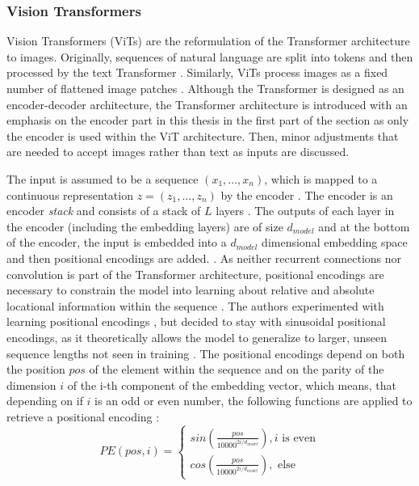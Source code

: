 \subsubsection{Vision Transformers}
\label{section: Vision Transformers}
Vision Transformers (ViTs) are the reformulation of the Transformer architecture \cite{Vaswani2017} to images.
Originally, sequences of natural language are split into tokens and then processed by the text Transformer \citep{Vaswani2017}.  
Similarly, ViTs process images as a fixed number of flattened image patches \citep{Dosovitskiy2020}.
Although the Transformer is designed as an encoder-decoder architecture, the Transformer architecture is introduced with an emphasis on the encoder part in this thesis in the first part of the section as only the encoder is used within the ViT architecture.
Then, minor adjustments that are needed to accept images rather than text as inputs are discussed.
\par
The input is assumed to be a sequence $(x_1,\dots,x_n)$, which is mapped to a continuous representation $z=(z_1,\dots,z_n)$ by the encoder \citep{Vaswani2017}.
The encoder is an encoder \textit{stack} and consists of a stack of $L$ layers \citep{Vaswani2017}.
The outputs of each layer in the encoder (including the embedding layers) are of size $d_{model}$ and at the bottom of the encoder, the input is embedded into a $d_{model}$ dimensional embedding space and then positional encodings are added. \citep{Vaswani2017}.
As neither recurrent connections nor convolution is part of the Transformer architecture, positional encodings are necessary to constrain the model into learning about relative and absolute locational information within the sequence \citep{Vaswani2017}.
The authors experimented with learning positional encodings \citep{Gehring2018}, but decided to stay with sinusoidal positional encodings, as it theoretically allows the model to generalize to larger, unseen sequence lengths not seen in training \citep{Vaswani2017}.
The positional encodings depend on both the position $pos$ of the element within the sequence and on the parity of the dimension $i$ of the i-th component of the embedding vector, which means, that depending on if $i$ is an odd or even number, the following functions are applied to retrieve a positional encoding \citep{Vaswani2017}:
\begin{equation}
	PE(pos, i) = 
	\begin{cases}
		sin(\frac{pos}{10000^{2i / d_{model}}}), i \text{ is even} \\
		cos(\frac{pos}{10000^{2i / d_{model}}}), \text{ else}
	\end{cases}
	\label{equation:positional-encoding}
\end{equation}
